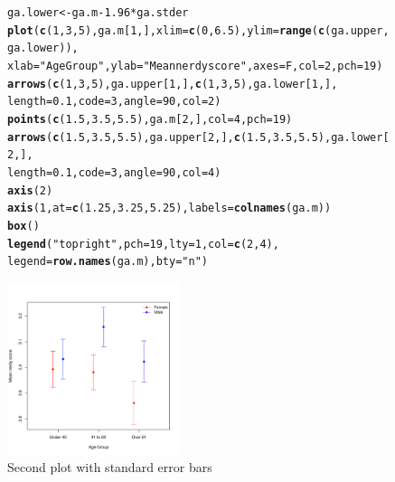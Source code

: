 \documentclass[12pt,a4paper]{article}\usepackage[]{graphicx}\usepackage[]{color}
\makeatletter
\newcommand{\hlnum}[1]{\textcolor[rgb]{0.686,0.059,0.569}{#1}}%
\newcommand{\hlstr}[1]{\textcolor[rgb]{0.192,0.494,0.8}{#1}}%
\newcommand{\hlopt}[1]{\textcolor[rgb]{0,0,0}{#1}}%
\newcommand{\hlstd}[1]{\textcolor[rgb]{0.345,0.345,0.345}{#1}}%
\newcommand{\hlkwb}[1]{\textcolor[rgb]{0.69,0.353,0.396}{#1}}%
\newcommand{\hlkwc}[1]{\textcolor[rgb]{0.333,0.667,0.333}{#1}}%
\newcommand{\hlkwd}[1]{\textcolor[rgb]{0.737,0.353,0.396}{\textbf{#1}}}%
\newenvironment{kframe}{%
 \def\at@end@of@kframe{}%
 \ifinner\ifhmode%
  \def\at@end@of@kframe{\end{minipage}}%
  \begin{minipage}{\columnwidth}%
 \fi\fi%
 \def\FrameCommand##1{\hskip\@totalleftmargin \hskip-\fboxsep
 \colorbox{shadecolor}{##1}\hskip-\fboxsep
     \hskip-\linewidth \hskip-\@totalleftmargin \hskip\columnwidth}%
 \MakeFramed {\advance\hsize-\width
   \@totalleftmargin\z@ \linewidth\hsize
   \@setminipage}}%
 {\par\unskip\endMakeFramed%
 \at@end@of@kframe}
\newenvironment{knitrout}{}{} %
\makeatother
\begin{document}
\begin{enumerate}
\begin{figure}[h]
\begin{knitrout}
\begin{kframe}
\begin{alltt}
\hlstd{ga.lower} \hlkwb{<-}\hlstd{ga.m} \hlopt{-} \hlnum{1.96}\hlopt{*}\hlstd{ga.stder}
\hlkwd{plot}\hlstd{(}\hlkwd{c}\hlstd{(}\hlnum{1}\hlstd{,} \hlnum{3}\hlstd{,} \hlnum{5}\hlstd{), ga.m[}\hlnum{1}\hlstd{, ],} \hlkwc{xlim} \hlstd{=} \hlkwd{c}\hlstd{(}\hlnum{0}\hlstd{,} \hlnum{6.5}\hlstd{),} \hlkwc{ylim} \hlstd{=} \hlkwd{range}\hlstd{(}\hlkwd{c}\hlstd{(ga.upper, ga.lower)),}
     \hlkwc{xlab} \hlstd{=} \hlstr{"Age Group"}\hlstd{,} \hlkwc{ylab} \hlstd{=} \hlstr{"Mean nerdy score"}\hlstd{,} \hlkwc{axes} \hlstd{= F,} \hlkwc{col} \hlstd{=} \hlnum{2}\hlstd{,} \hlkwc{pch} \hlstd{=} \hlnum{19}\hlstd{)}
\hlkwd{arrows}\hlstd{(}\hlkwd{c}\hlstd{(}\hlnum{1}\hlstd{,} \hlnum{3}\hlstd{,} \hlnum{5}\hlstd{), ga.upper[}\hlnum{1}\hlstd{, ],} \hlkwd{c}\hlstd{(}\hlnum{1}\hlstd{,} \hlnum{3}\hlstd{,} \hlnum{5}\hlstd{), ga.lower[}\hlnum{1}\hlstd{, ],}
       \hlkwc{length} \hlstd{=} \hlnum{0.1}\hlstd{,} \hlkwc{code} \hlstd{=} \hlnum{3}\hlstd{,} \hlkwc{angle} \hlstd{=} \hlnum{90}\hlstd{,} \hlkwc{col} \hlstd{=} \hlnum{2}\hlstd{)}
\hlkwd{points}\hlstd{(}\hlkwd{c}\hlstd{(}\hlnum{1.5}\hlstd{,} \hlnum{3.5}\hlstd{,} \hlnum{5.5}\hlstd{), ga.m[}\hlnum{2}\hlstd{, ],} \hlkwc{col} \hlstd{=} \hlnum{4}\hlstd{,} \hlkwc{pch} \hlstd{=} \hlnum{19}\hlstd{)}
\hlkwd{arrows}\hlstd{(}\hlkwd{c}\hlstd{(}\hlnum{1.5}\hlstd{,} \hlnum{3.5}\hlstd{,} \hlnum{5.5}\hlstd{), ga.upper[}\hlnum{2}\hlstd{, ],} \hlkwd{c}\hlstd{(}\hlnum{1.5}\hlstd{,} \hlnum{3.5}\hlstd{,} \hlnum{5.5}\hlstd{), ga.lower[}\hlnum{2}\hlstd{, ],}
       \hlkwc{length} \hlstd{=} \hlnum{0.1}\hlstd{,} \hlkwc{code} \hlstd{=} \hlnum{3}\hlstd{,} \hlkwc{angle} \hlstd{=} \hlnum{90}\hlstd{,} \hlkwc{col} \hlstd{=} \hlnum{4}\hlstd{)}
\hlkwd{axis}\hlstd{(}\hlnum{2}\hlstd{)}
\hlkwd{axis}\hlstd{(}\hlnum{1}\hlstd{,} \hlkwc{at}\hlstd{=}\hlkwd{c}\hlstd{(}\hlnum{1.25}\hlstd{,} \hlnum{3.25}\hlstd{,} \hlnum{5.25}\hlstd{),} \hlkwc{labels} \hlstd{=} \hlkwd{colnames}\hlstd{(ga.m))}
\hlkwd{box}\hlstd{()}
\hlkwd{legend}\hlstd{(}\hlstr{"topright"}\hlstd{,} \hlkwc{pch} \hlstd{=} \hlnum{19}\hlstd{,} \hlkwc{lty} \hlstd{=} \hlnum{1}\hlstd{,} \hlkwc{col} \hlstd{=} \hlkwd{c}\hlstd{(}\hlnum{2}\hlstd{,} \hlnum{4}\hlstd{),}
       \hlkwc{legend} \hlstd{=} \hlkwd{row.names}\hlstd{(ga.m),} \hlkwc{bty} \hlstd{=} \hlstr{"n"}\hlstd{)}
\end{alltt}
\end{kframe}
\includegraphics[width=0.45\textwidth]{figure/stder2-1} 

\end{knitrout}
\caption{Second plot with standard error bars}
  \label{fig:stder2}
\end{figure}
\end{enumerate}
\end{document}
